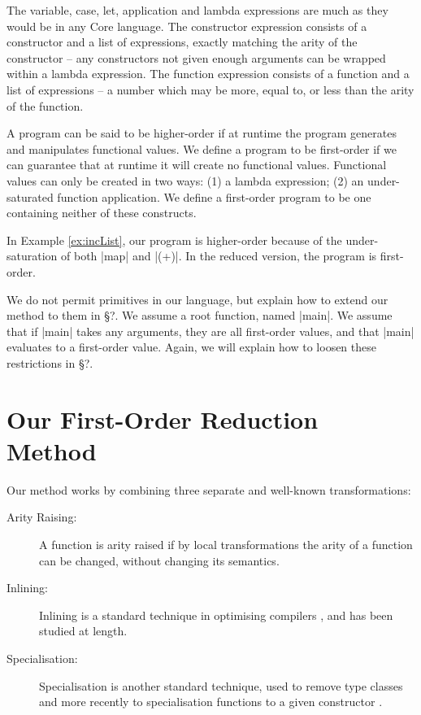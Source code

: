 \documentclass[preprint]{sigplanconf}
\begin{document}
The variable, case, let, application and lambda expressions are much as they would be in any Core language. The constructor expression consists of a constructor and a list of expressions, exactly matching the arity of the constructor -- any constructors not given enough arguments can be wrapped within a lambda expression. The function expression consists of a function and a list of expressions -- a number which may be more, equal to, or less than the arity of the function.

A program can be said to be higher-order if at runtime the program generates and manipulates functional values. We define a program to be first-order if we can guarantee that at runtime it will create no functional values. Functional values can only be created in two ways: (1) a lambda expression; (2) an under-saturated function application. We define a first-order program to be one containing neither of these constructs.

In Example \ref{ex:incList}, our program is higher-order because of the under-saturation of both |map| and |(+)|. In the reduced version, the program is first-order.

We do not permit primitives in our language, but explain how to extend our method to them in \S?. We assume a root function, named |main|. We assume that if |main| takes any arguments, they are all first-order values, and that |main| evaluates to a first-order value. Again, we will explain how to loosen these restrictions in \S?.


\section{Our First-Order Reduction Method}

Our method works by combining three separate and well-known transformations:

\begin{description}
\item[Arity Raising:] A function is arity raised \cite{arity_raising} if by local transformations the arity of a function can be changed, without changing its semantics.
\item[Inlining:] Inlining is a standard technique in optimising compilers \cite{spj:inline}, and has been studied at length.
\item[Specialisation:] Specialisation is another standard technique, used to remove type classes \cite{hudak:removing_type_classes} and more recently to specialisation functions to a given constructor \cite{spj:specconstr}.
\end{description}
\end{document}
